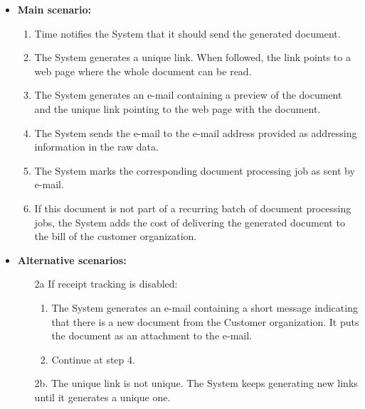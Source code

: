 \documentclass[a4paper,10pt]{article}
\begin{document}
\begin{itemize}
    \item \textbf{Main scenario:} 
    \begin{enumerate}
       \item Time notifies the System that it should send the generated document.
       \item The System generates a unique link. When followed, the link points to a web page where the whole document can be read.
       \item The System generates an e-mail containing a preview of the document and the unique link  pointing to the web page with the document.
       \item The System sends the e-mail to the e-mail address provided as  addressing information in the raw data. 
       \item The System marks the corresponding document processing job as sent by e-mail.
       \item If this document is not part of a recurring batch of document processing jobs, the System adds the cost of delivering the generated document to the bill of the customer organization.
    \end{enumerate}

    \item \textbf{Alternative scenarios:} 
    \begin{enumerate}
        \item[2a] If receipt tracking is disabled:
        	\begin{enumerate}
        		\item The System generates an e-mail containing a short message indicating that there is a new document from the Customer organization. It puts the document as an attachment to the e-mail.
       			\item Continue at step 4.
       		\end{enumerate} 
        \item [2b.] The unique link is not unique. The System keeps generating new links until it generates a unique one.	
    \end{enumerate}
\end{itemize}
\end{document}
